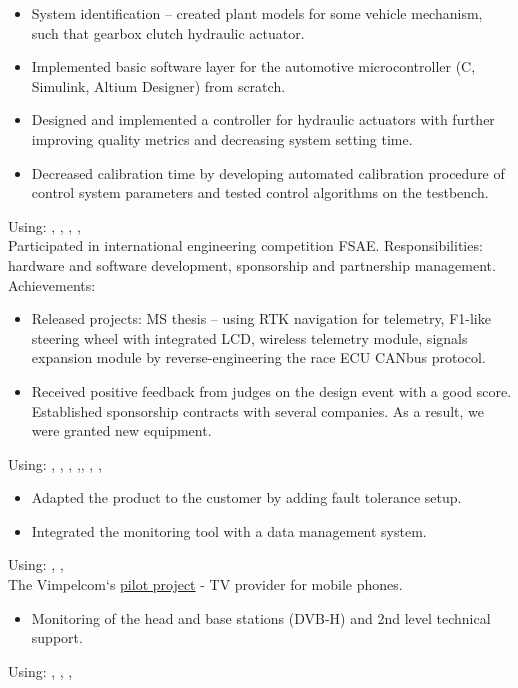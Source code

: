 \begin{itemize}
    \item System identification -- created plant models for some vehicle mechanism, such that gearbox clutch hydraulic actuator.
    \item Implemented basic software layer for the automotive microcontroller (C, Simulink, Altium Designer) from scratch.
    \item Designed and implemented a controller for hydraulic actuators with further improving quality metrics and decreasing system setting time.
    \item Decreased calibration time by developing automated calibration procedure of control system parameters and tested control algorithms on the testbench.
\end{itemize}
Using: , , , , 
\horizontalline
% 
 \\
Participated in international engineering competition FSAE.
Responsibilities: hardware and software development, sponsorship and partnership management.
Achievements:
\begin{itemize}
    \item Released projects: MS thesis -- using RTK navigation for telemetry, F1-like steering wheel with integrated LCD, wireless telemetry module, signals expansion module by reverse-engineering the race ECU CANbus protocol.
    \item Received positive feedback from judges on the design event with a good score. Established sponsorship contracts with several companies. As a result, we were granted new equipment.
\end{itemize}
Using: , , , ,, , , 
\horizontalline
% 
\begin{itemize}
    \item Adapted the product to the customer by adding fault tolerance setup.
    \item Integrated the monitoring tool with a data management system.
\end{itemize}
Using: , , 
\horizontalline
% 
\\
The Vimpelcom`s \href{https://www.dvb.org/news/russia-to-launch-dvb-h-services}{pilot project} - TV provider for mobile phones.
\begin{itemize}
    \item Monitoring of the head and base stations (DVB-H) and 2nd level technical support.
\end{itemize}
Using: , , , 

